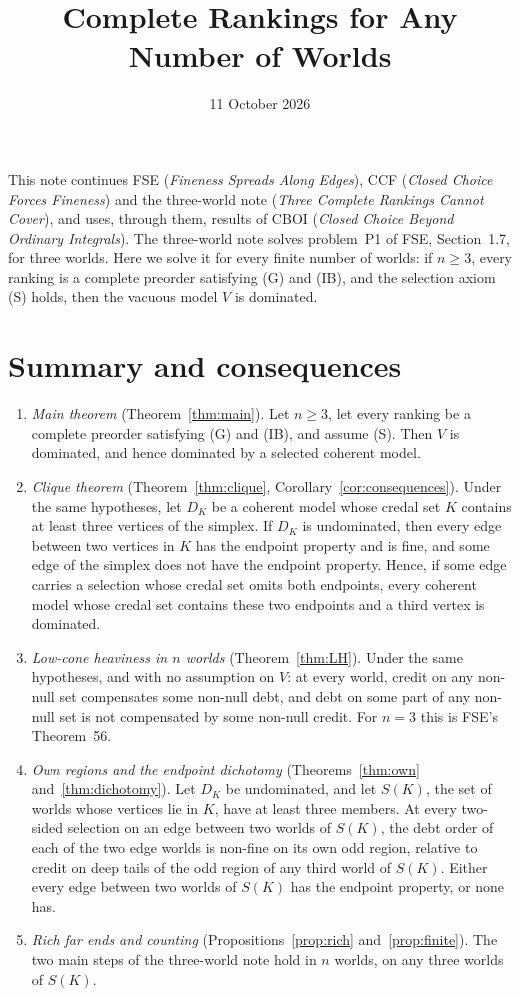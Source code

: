 \documentclass[11pt]{article}
\title{Complete Rankings for Any Number of Worlds}
\author{}\date{11 October 2026}
\theoremstyle{definition}\newtheorem{definition}[theorem]{Definition}
\theoremstyle{remark}\newtheorem{remark}[theorem]{Remark}
\begin{document}
\maketitle

\noindent
This note continues FSE (\emph{Fineness Spreads Along Edges}), CCF
(\emph{Closed Choice Forces Fineness}) and the three-world note
(\emph{Three Complete Rankings Cannot Cover}), and uses, through them,
results of CBOI (\emph{Closed Choice Beyond Ordinary Integrals}). The
three-world note solves problem~P1 of FSE, Section~1.7, for three worlds.
Here we solve it for every finite number of worlds: if $n\ge3$, every
ranking is a complete preorder satisfying (G) and (IB), and the selection
axiom (S) holds, then the vacuous model $V$ is dominated.

\section{Summary and consequences}\label{sec:summary}

\begin{enumerate}[leftmargin=*,itemsep=3pt]
\item \emph{Main theorem} (Theorem~\ref{thm:main}). Let $n\ge3$, let every
ranking be a complete preorder satisfying (G) and (IB), and assume (S).
Then $V$ is dominated, and hence dominated by a selected coherent model.
\item \emph{Clique theorem} (Theorem~\ref{thm:clique},
Corollary~\ref{cor:consequences}). Under the same hypotheses, let $D_K$ be
a coherent model whose credal set $K$ contains at least three vertices of
the simplex. If $D_K$ is undominated, then every edge between two vertices
in $K$ has the endpoint property and is fine, and some edge of the simplex
does not have the endpoint property. Hence, if some edge carries a
selection whose credal set omits both endpoints, every coherent model whose
credal set contains these two endpoints and a third vertex is dominated.
\item \emph{Low-cone heaviness in $n$ worlds} (Theorem~\ref{thm:LH}). Under
the same hypotheses, and with no assumption on $V$: at every world, credit
on any non-null set compensates some non-null debt, and debt on some part
of any non-null set is not compensated by some non-null credit. For $n=3$
this is FSE's Theorem~56.
\item \emph{Own regions and the endpoint dichotomy}
(Theorems~\ref{thm:own} and~\ref{thm:dichotomy}). Let $D_K$ be undominated,
and let $S(K)$, the set of worlds whose vertices lie in $K$, have at least
three members. At every two-sided selection on an edge between two worlds
of $S(K)$, the debt order of each of the two edge worlds is non-fine on its
own odd region, relative to credit on deep tails of the odd region of any
third world of $S(K)$. Either every edge between two worlds of $S(K)$ has
the endpoint property, or none has.
\item \emph{Rich far ends and counting} (Propositions~\ref{prop:rich}
and~\ref{prop:finite}). The two main steps of the three-world note hold in
$n$ worlds, on any three worlds of $S(K)$.
\end{enumerate}
\end{document}
